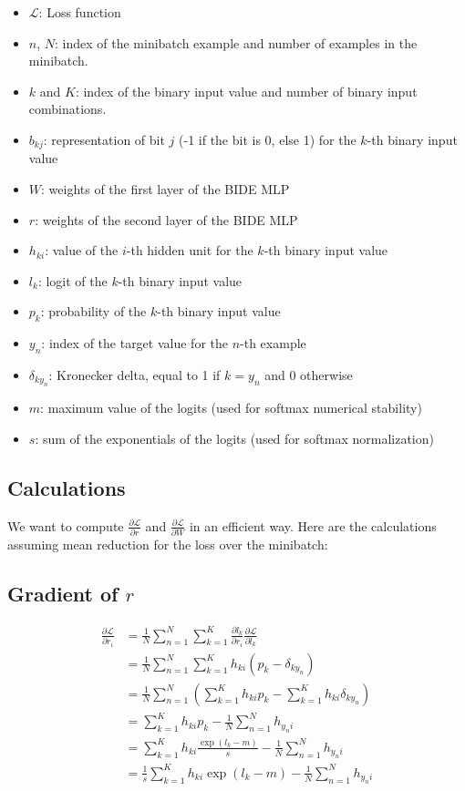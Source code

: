\documentclass{article}
\begin{document}
\begin{itemize}
    \item $\mathcal{L}$: Loss function 
    \item $n$, $N$: index of the minibatch example and number of examples in the minibatch.
    \item $k$ and $K$: index of the binary input value and number of binary input combinations.
    \item $b_{kj}$: representation of bit $j$ (-1 if the bit is 0, else 1) for the $k$-th binary input value
    \item $W$: weights of the first layer of the BIDE MLP
    \item $r$: weights of the second layer of the BIDE MLP
    \item $h_{ki}$: value of the $i$-th hidden unit for the $k$-th binary input value
    \item $l_{k}$: logit of the $k$-th binary input value
    \item $p_{k}$: probability of the $k$-th binary input value
    \item $y_n$: index of the target value for the $n$-th example
    \item $\delta_{ky_n}$: Kronecker delta, equal to 1 if $k = y_n$ and 0 otherwise
    \item $m$: maximum value of the logits (used for softmax numerical stability)
    \item $s$: sum of the exponentials of the logits (used for softmax normalization)
\end{itemize}

\subsection*{Calculations}

We want to compute $\frac{\partial \mathcal{L}}{\partial r}$ and $\frac{\partial \mathcal{L}}{\partial W}$ in an efficient way. Here are the calculations assuming mean reduction for the loss over the minibatch:

\subsection*{Gradient of $r$}
\[
\begin{aligned}
\frac{\partial \mathcal{L}}{\partial r_i} &= \frac{1}{N} \sum_{n=1}^{N} \sum_{k=1}^{K} \frac{\partial l_k}{\partial r_i} \frac{\partial \mathcal{L}}{\partial l_k} \\
&= \frac{1}{N} \sum_{n=1}^{N} \sum_{k=1}^{K} h_{ki} (p_k - \delta_{ky_n}) \\
&= \frac{1}{N} \sum_{n=1}^{N} \left( \sum_{k=1}^{K} h_{ki} p_k - \sum_{k=1}^{K} h_{ki} \delta_{ky_n} \right) \\
&= \sum_{k=1}^{K} h_{ki} p_k - \frac{1}{N} \sum_{n=1}^{N} h_{y_ni} \\
&= \sum_{k=1}^{K} h_{ki} \frac{\exp(l_k - m)}{s} - \frac{1}{N} \sum_{n=1}^{N} h_{y_ni} \\
&= \frac{1}{s} \sum_{k=1}^{K} h_{ki} \exp(l_k - m) - \frac{1}{N} \sum_{n=1}^{N} h_{y_ni} \\
\end{aligned}
\]
\end{document}
